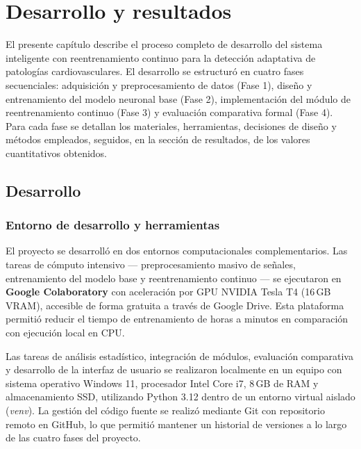 
 

\chapter{Desarrollo y resultados}

El presente capítulo describe el proceso completo de desarrollo del sistema inteligente con reentrenamiento continuo para la detección adaptativa de patologías cardiovasculares. El desarrollo se estructuró en cuatro fases secuenciales: adquisición y preprocesamiento de datos (Fase 1), diseño y entrenamiento del modelo neuronal base (Fase 2), implementación del módulo de reentrenamiento continuo (Fase 3) y evaluación comparativa formal (Fase 4). Para cada fase se detallan los materiales, herramientas, decisiones de diseño y métodos empleados, seguidos, en la sección de resultados, de los valores cuantitativos obtenidos.

\section{Desarrollo}

\subsection{Entorno de desarrollo y herramientas}

El proyecto se desarrolló en dos entornos computacionales complementarios. Las tareas de cómputo intensivo — preprocesamiento masivo de señales, entrenamiento del modelo base y reentrenamiento continuo — se ejecutaron en \textbf{Google Colaboratory} con aceleración por GPU NVIDIA Tesla T4 (16\,GB VRAM), accesible de forma gratuita a través de Google Drive. Esta plataforma permitió reducir el tiempo de entrenamiento de horas a minutos en comparación con ejecución local en CPU.

Las tareas de análisis estadístico, integración de módulos, evaluación comparativa y desarrollo de la interfaz de usuario se realizaron localmente en un equipo con sistema operativo Windows 11, procesador Intel Core i7, 8\,GB de RAM y almacenamiento SSD, utilizando Python 3.12 dentro de un entorno virtual aislado (\textit{venv}). La gestión del código fuente se realizó mediante Git con repositorio remoto en GitHub, lo que permitió mantener un historial de versiones a lo largo de las cuatro fases del proyecto.

